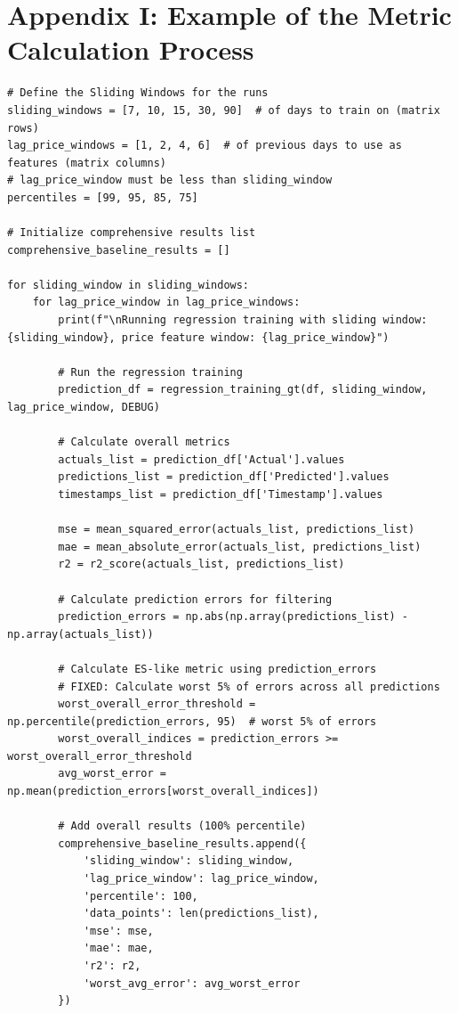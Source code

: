 \documentclass[12pt]{report} %
\begin{document}
\chapter* {Appendix I: Example of the Metric Calculation Process}
\label{app:appendix_i_example_metric_calculation_process}

\begin{lstlisting}
# Define the Sliding Windows for the runs
sliding_windows = [7, 10, 15, 30, 90]  # of days to train on (matrix rows)
lag_price_windows = [1, 2, 4, 6]  # of previous days to use as features (matrix columns)
# lag_price_window must be less than sliding_window
percentiles = [99, 95, 85, 75]

# Initialize comprehensive results list
comprehensive_baseline_results = []

for sliding_window in sliding_windows:
    for lag_price_window in lag_price_windows:
        print(f"\nRunning regression training with sliding window: {sliding_window}, price feature window: {lag_price_window}")

        # Run the regression training
        prediction_df = regression_training_gt(df, sliding_window, lag_price_window, DEBUG)
        
        # Calculate overall metrics
        actuals_list = prediction_df['Actual'].values
        predictions_list = prediction_df['Predicted'].values
        timestamps_list = prediction_df['Timestamp'].values

        mse = mean_squared_error(actuals_list, predictions_list)
        mae = mean_absolute_error(actuals_list, predictions_list)
        r2 = r2_score(actuals_list, predictions_list)

        # Calculate prediction errors for filtering
        prediction_errors = np.abs(np.array(predictions_list) - np.array(actuals_list))

        # Calculate ES-like metric using prediction_errors
        # FIXED: Calculate worst 5% of errors across all predictions
        worst_overall_error_threshold = np.percentile(prediction_errors, 95)  # worst 5% of errors
        worst_overall_indices = prediction_errors >= worst_overall_error_threshold
        avg_worst_error = np.mean(prediction_errors[worst_overall_indices])

        # Add overall results (100% percentile)
        comprehensive_baseline_results.append({
            'sliding_window': sliding_window,
            'lag_price_window': lag_price_window,
            'percentile': 100,
            'data_points': len(predictions_list),
            'mse': mse,
            'mae': mae,
            'r2': r2,
            'worst_avg_error': avg_worst_error
        })


\end{lstlisting}
\end{document}
